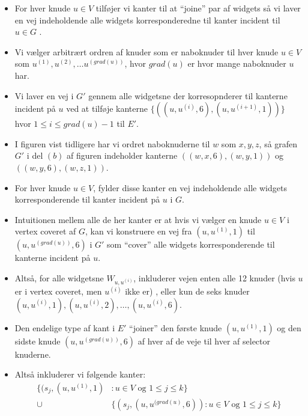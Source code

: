 \begin{frame}[allowframebreaks]
\begin{itemize}
\begin{center}
		      \end{center}
		\item For hver knude $u \in V$ tilføjer vi kanter til at ``joine'' par af widgets så vi laver en vej indeholdende alle widgets korresponderedne til kanter incident til $u \in G$ .
		\item Vi vælger arbitrært ordren af knuder som er naboknuder til hver knude $u \in V$  som $u^{(1)}, u^{(2)}, \ldots u^{(grad(u))}$, hvor $grad(u)$ er hvor mange naboknuder $u$ har.
		\item Vi laver en vej i $G'$ gennem alle widgetsne der korresopnderer til kanterne incident på $u$ ved at tilføje kanterne $\{((u,u^{(i)}, 6), (u, u^{(i+1)}, 1))\}$ hvor $1 \le i \le grad(u)-1$ til $E'$.
		\item I figuren vist tidligere har vi ordret naboknuderne til $w$ som $x,y,z$, så grafen $G'$ i del $(b)$ af figuren indeholder kanterne $((w,x,6), (w,y,1))$ og $((w,y,6), (w,z,1))$.
		\item For hver knude $u \in V$, fylder disse kanter en vej indeholdende alle widgets korresponderende til kanter incident på $u$ i $G$.
		\item Intuitionen mellem alle de her kanter er at hvis vi vælger en knude $u \in V$ i vertex coveret af $G$, kan vi konstruere en vej fra $(u, u^{(1)}, 1)$ til $(u, u^{(grad(u))}, 6)$ i $G'$ som ``cover'' alle widgets korresponderende til kanterne incident på $u$.
		\item Altså, for alle widgetsne $W_{u,u^{(i)}}$, inkluderer vejen enten alle 12 knuder (hvis $u$ er i vertex coveret, men $u^{(i)}$ ikke er) , eller kun de seks knuder $(u, u^{(i)}, 1), (u, u^{(i)}, 2), \ldots, (u, u^{(i)}, 6)$.
		\item Den endelige type af kant i $E'$ ``joiner'' den første knude $(u, u^{(1)}, 1)$ og den sidste knude $(u, u^{(grad(u))}, 6)$ af hver af de veje til hver af selector knuderne.
		\item Altså inkluderer vi følgende kanter:
		      \begin{align*}
			      \{(s_{j}, (u, u^{(1)}, 1) & : u \in V \text{ og } 1 \le j \le k\}                                 \\
			      \cup                      & \{(s_{j}, (u, u^{(grad(u)}, 6)) : u \in V \text{ og } 1 \le j \le k\}
		      \end{align*}


\end{itemize}
\end{frame}
